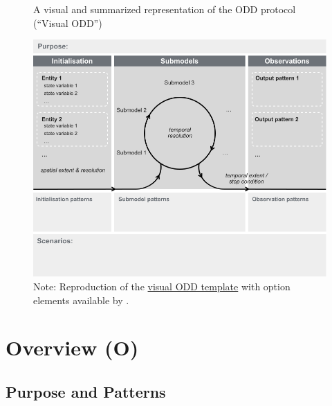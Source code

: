 \documentclass[
  man,
  10pt,
  a4paper,
  floatsintext
]{apa7}
\begin{document}
\begin{landscape}
  \begin{figure}
    \caption{
      A visual and summarized representation of the ODD protocol (“Visual ODD”)
    }
    \centering
    \includegraphics[width=0.7\linewidth]{images/szangolies-2024-template-optional.png}
    \caption*{
      Note: Reproduction of the \href{https://github.com/visual-ODD/Templates}{visual ODD template} with option elements available by \textcite{szangolies2024}.
    }
    \label{fig:visualodd}
  \end{figure}
\end{landscape}


\section{Overview (O)}

\subsection{Purpose and Patterns}

\begin{guidingbox}
  \begin{tcbitemize}
    \item[\gddarkredb{\arrowbullet}] 
    \item[\gddarkcornflowerblueb{\arrowbullet}] 
    \item[\gddarkgreenb{\arrowbullet}] 
  \end{tcbitemize}
\end{guidingbox}
\end{document}
